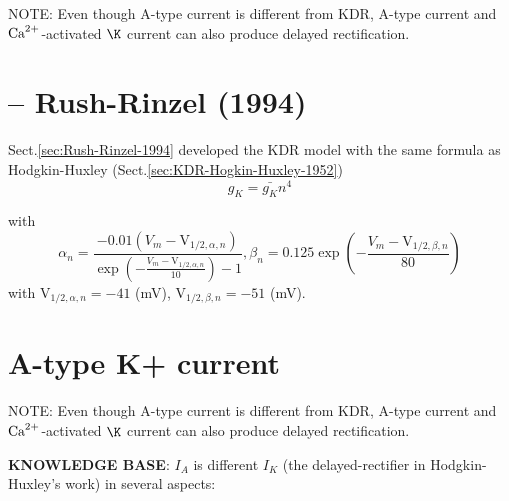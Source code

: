 \begin{framed}
NOTE: Even though A-type current is different from KDR, A-type current and
${\text{Ca}^{2+}}$-activated $\K$ current can also produce delayed rectification. 
\end{framed}  

\section{-- Rush-Rinzel (1994)}
\label{sec:KDR-Rush-Rinzel-1994}

Sect.\ref{sec:Rush-Rinzel-1994} developed the KDR model with the same formula as
Hodgkin-Huxley (Sect.\ref{sec:KDR-Hogkin-Huxley-1952})
\begin{equation}
  \label{eq:2941}
  g_K = \bar{g_K}n^4
\end{equation}

with
\def\Vhan{{\text{V}_{1/2,\alpha,n}}}
\def\Vhbn{{\text{V}_{1/2,\beta,n}}}
\begin{equation}
      \alpha_n = \frac{-0.01 (V_m - \Vhan)}{\exp(-\frac{V_m - \Vhan}{10})-1}
      ,
      \beta_n = 0.125 \exp(-\frac{V_m - \Vhbn}{80})  
\end{equation}
with $\Vhan = -41$ (mV), $\Vhbn = -51$ (mV).
      
\section{A-type K+ current}
\label{sec:A-type-K+-model}

\begin{framed}
NOTE: Even though A-type current is different from KDR, A-type current and
${\text{Ca}^{2+}}$-activated $\K$ current can also produce delayed rectification. 
\end{framed}  

{\bf KNOWLEDGE BASE}: $I_A$ is different $I_K$ (the delayed-rectifier in
Hodgkin-Huxley's work) in several aspects:

